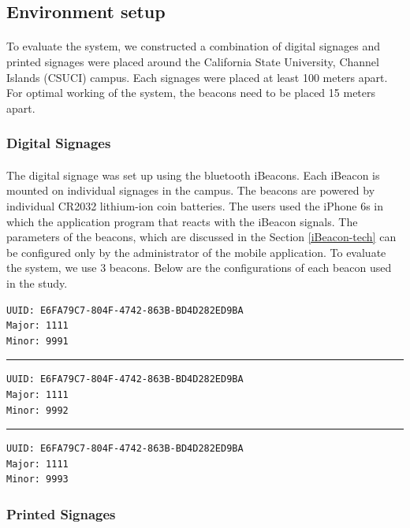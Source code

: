 \documentclass[12pt]{article}
\begin{document}
\subsection{Environment setup}
\label{env}
\paragraph{}To evaluate the system, we constructed a combination of digital signages and printed signages were placed around the California State University, Channel Islands (CSUCI) campus. Each signages were placed at least 100 meters apart. For optimal working of the system, the beacons need to be placed 15 meters apart.

\subsubsection{Digital Signages}
\paragraph{}The digital signage was set up using the bluetooth iBeacons. Each iBeacon is mounted on individual signages in the campus. The beacons are powered by individual CR2032 lithium-ion coin batteries. The users used the iPhone 6s in which the application program that reacts with the iBeacon signals. The parameters of the beacons, which are discussed in the Section \ref{iBeacon-tech} can be configured only by the administrator of the mobile application. To evaluate the system, we use 3 beacons. Below are the configurations of each beacon used in the study.

\begin{lstlisting}
UUID: E6FA79C7-804F-4742-863B-BD4D282ED9BA
Major: 1111
Minor: 9991
\end{lstlisting}

\noindent\rule{13cm}{0.4pt}

\begin{lstlisting}
UUID: E6FA79C7-804F-4742-863B-BD4D282ED9BA
Major: 1111
Minor: 9992
\end{lstlisting}

\noindent\rule{13cm}{0.4pt}

\begin{lstlisting}
UUID: E6FA79C7-804F-4742-863B-BD4D282ED9BA
Major: 1111
Minor: 9993
\end{lstlisting}

\subsubsection{Printed Signages}
\label{printed-signages}
\end{document}
